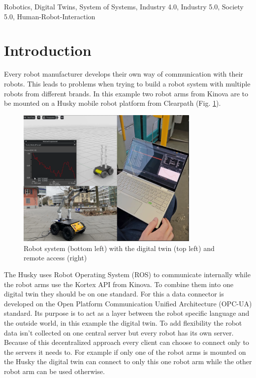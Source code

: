 \documentclass[conference]{IEEEtran}
\begin{document}
\begin{IEEEkeywords}
Robotics, Digital Twins, System of Systems, Industry 4.0, Industry 5.0, Society 5.0, Human-Robot-Interaction
\end{IEEEkeywords}

\section{Introduction}
Every robot manufacturer develops their own way of communication with their robots.
This leads to problems when trying to build a robot system with multiple robots from different brands.
In this example two robot arms from Kinova are to be mounted on a Husky mobile robot platform from Clearpath (Fig. \ref{fig:TitelBild}).
\begin{figure}[htbp]
    \centerline{\includegraphics[width=8.9cm]{Pictures/TitelBild.png}}
    \caption{Robot system (bottom left) with the digital twin (top left) and remote access (right)}
    \label{fig:TitelBild}
\end{figure}
The Husky uses Robot Operating System (ROS) to communicate internally while the robot arms use the Kortex API from Kinova.
To combine them into one digital twin they should be on one standard.
For this a data connector is developed on the Open Platform Communication Unified Architecture (OPC-UA) standard.
Its purpose is to act as a layer between the robot specific language and the outside world, in this example the digital twin.
To add flexibility the robot data isn't collected on one central server but every robot has its own server.
Because of this decentralized approach every client can choose to connect only to the servers it needs to.
For example if only one of the robot arms is mounted on the Husky the digital twin can connect to only this one robot arm while the other robot arm can be used otherwise.
\end{document}
